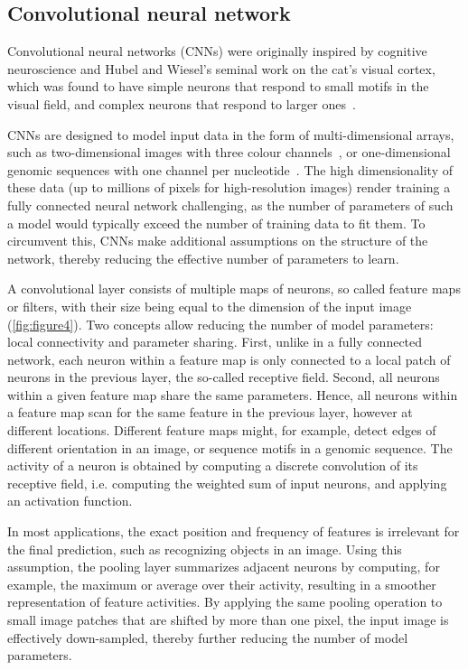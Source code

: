 \subsection{Convolutional neural network}
Convolutional neural networks (CNNs) were originally inspired by cognitive neuroscience and Hubel and Wiesel's seminal work on the cat's visual cortex, which was found to have simple neurons that respond to small motifs in the visual field, and complex neurons that respond to larger ones~\citep{hubel_shape_1963,hubel_period_1970}.

CNNs are designed to model input data in the form of multi-dimensional arrays, such as two-dimensional images with three colour channels~\citep{he_deep_2015,jarrett_what_2009,krizhevsky_imagenet_2012,lecun_backpropagation_1989,szegedy_rethinking_2015,zeiler_visualizing_2014}, or one-dimensional genomic sequences with one channel per nucleotide~\citep{alipanahi_predicting_2015,angermueller_accurate_2017,kelley_basset:_2016,zhou_predicting_2015}. The high dimensionality of these data (up to millions of pixels for high-resolution images) render training a fully connected neural network challenging, as the number of parameters of such a model would typically exceed the number of training data to fit them. To circumvent this, CNNs make additional assumptions on the structure of the network, thereby reducing the effective number of parameters to learn.

A convolutional layer consists of multiple maps of neurons, so called feature maps or filters, with their size being equal to the dimension of the input image (\autoref{fig:figure4}). Two concepts allow reducing the number of model parameters: local connectivity and parameter sharing. First, unlike in a fully connected network, each neuron within a feature map is only connected to a local patch of neurons in the previous layer, the so-called receptive field. Second, all neurons within a given feature map share the same parameters. Hence, all neurons within a feature map scan for the same feature in the previous layer, however at different locations. Different feature maps might, for example, detect edges of different orientation in an image, or sequence motifs in a genomic sequence. The activity of a neuron is obtained by computing a discrete convolution of its receptive field, i.e. computing the weighted sum of input neurons, and applying an activation function.

In most applications, the exact position and frequency of features is irrelevant for the final prediction, such as recognizing objects in an image. Using this assumption, the pooling layer summarizes adjacent neurons by computing, for example, the maximum or average over their activity, resulting in a smoother representation of feature activities. By applying the same pooling operation to small image patches that are shifted by more than one pixel, the input image is effectively down-sampled, thereby further reducing the number of model parameters.

